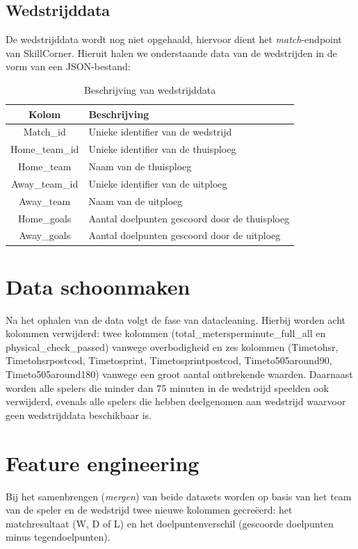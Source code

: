 \subsection{Wedstrijddata}

De wedstrijddata wordt nog niet opgehaald, hiervoor dient het \emph{match}-endpoint van SkillCorner. Hieruit halen we onderstaande data van de wedstrijden in de vorm van een JSON-bestand:
\begin{longtable}{ c | p{10cm} }
\caption{Beschrijving van wedstrijddata} \\
\hline
\textbf{Kolom} & \textbf{Beschrijving} \\
\hline

Match\_id & Unieke identifier van de wedstrijd \\
Home\_team\_id & Unieke identifier van de thuisploeg \\
Home\_team & Naam van de thuisploeg \\
Away\_team\_id & Unieke identifier van de uitploeg \\
Away\_team & Naam van de uitploeg \\
Home\_goals & Aantal doelpunten gescoord door de thuisploeg \\
Away\_goals & Aantal doelpunten gescoord door de uitploeg \\

\hline
\end{longtable}

\section{Data schoonmaken}

Na het ophalen van de data volgt de fase van datacleaning. Hierbij worden acht kolommen verwijderd: twee kolommen (total\_metersperminute\_full\_all en physical\_check\_passed) vanwege overbodigheid en zes kolommen (Timetohsr, Timetohsrpostcod, Timetosprint, Timetosprintpostcod, Timeto505around90, Timeto505around180) vanwege een groot aantal ontbrekende waarden. Daarnaast worden alle spelers die minder dan 75 minuten in de wedstrijd speelden ook verwijderd, evenals alle spelers die hebben deelgenomen aan wedstrijd waarvoor geen wedstrijddata beschikbaar is.

\section{Feature engineering}

Bij het samenbrengen (\emph{mergen}) van beide datasets worden op basis van het team van de speler en de wedstrijd twee nieuwe kolommen gecreëerd: het matchresultaat (W, D of L) en het doelpuntenverschil (gescoorde doelpunten minus tegendoelpunten).

